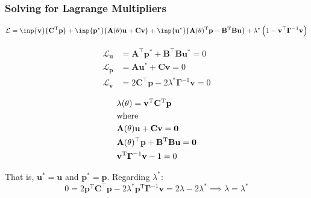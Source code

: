 \documentclass[
  pdf,
  10pt,
  xcolor={svgnames},
]{beamer}
\newcommand{\mbf}[1]{\mathbf{#1}}
\newcommand{\mc}[1]{\mathcal{#1}}
\newcommand{\T}{\mathrm{T}}
\newcommand{\mat}[1]{\mathbf{{#1}}}
\begin{document}
\begin{frame}
  \frametitle{Solving for Lagrange Multipliers}
  \begin{block}{}
    \begin{equation*}
      \mc{L}
      = \inp{\mbf{v}}{\mat{C}^\T \mbf{p}}
      + \inp{\mbf{p}^*}{\mat{A}(\theta)\mbf{u} + \mat{C} \mbf{v}}
      + \inp{\mbf{u}^*}{
        \mat{A}(\theta)^\T \mbf{p} - \mat{B}^\T \mat{B} \mbf{u}
      }
      + \lambda^* \left( 1-\mbf{v}^\top \mat{\Gamma}^{-1} \mbf{v} \right)
    \end{equation*}
  \end{block}
  \begin{minipage}{.5\linewidth}
    \begin{align*}
      \mc{L}_\mbf{u}
       & = \mat{A}^\top \mbf{p}^* + \mat{B}^\top\mat{B} \mbf{u}^* = 0       \\
      \mc{L}_\mbf{p}
       & = \mat{A} \mbf{u}^* + \mat{C} \mbf{v} = 0                          \\
      \mc{L}_\mbf{v}
       & = 2\mat{C}^\top \mbf{p} - 2\lambda^* \mat{\Gamma}^{-1} \mbf{v} = 0
    \end{align*}
  \end{minipage}%
  \begin{minipage}{.5\linewidth}
    \begin{align*}
       &
      \lambda(\theta)
      = \mbf{v}^\T \mat{C}^\T \mbf{p}        \\
       & \text{where}\notag                  \\
       &
      \mat{A}(\theta)\mbf{u}
      + \mat{C} \mbf{v} = \mbf{0}            \\
       &
      \mat{A}({\theta})^\top \mbf{p}
      + \mat{B}^\T \mat{B} \mbf{u} = \mbf{0} \\
       &
      \mbf{v}^\T \mat{\Gamma}^{-1}\mbf{v}
      - 1 = 0
    \end{align*}
  \end{minipage}
  That is, $\mbf{u}^* = \mbf{u}$ and $\mbf{p}^* = \mbf{p}$. \pause Regarding
  $\lambda^*$:
  \[
    0 =
    2\mbf{p}^\T \mat{C}^\top \mbf{p}
    - 2\lambda^* \mbf{p}^\T \mat{\Gamma}^{-1} \mbf{v}
    = 2 \lambda - 2 \lambda^*
    \implies \lambda = \lambda^*
  \]
\end{frame}
\end{document}

